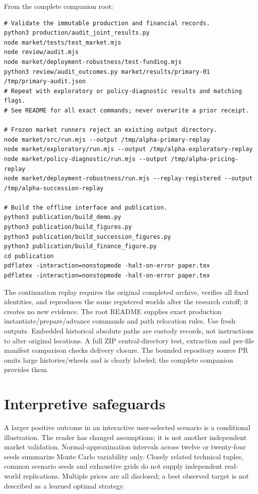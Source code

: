 \documentclass[11pt,a4paper]{article}
\begin{document}
From the complete companion root:
\begin{lstlisting}
# Validate the immutable production and financial records.
python3 production/audit_joint_results.py
node market/tests/test_market.mjs
node review/audit.mjs
node market/deployment-robustness/test-funding.mjs
python3 review/audit_outcomes.py market/results/primary-01 /tmp/primary-audit.json
# Repeat with exploratory or policy-diagnostic results and matching flags.
# See README for all exact commands; never overwrite a prior receipt.

# Frozen market runners reject an existing output directory.
node market/src/run.mjs --output /tmp/alpha-primary-replay
node market/exploratory/run.mjs --output /tmp/alpha-exploratory-replay
node market/policy-diagnostic/run.mjs --output /tmp/alpha-pricing-replay
node market/deployment-robustness/run.mjs --replay-registered --output /tmp/alpha-succession-replay

# Build the offline interface and publication.
python3 publication/build_demo.py
python3 publication/build_figures.py
python3 publication/build_succession_figures.py
python3 publication/build_finance_figure.py
cd publication
pdflatex -interaction=nonstopmode -halt-on-error paper.tex
pdflatex -interaction=nonstopmode -halt-on-error paper.tex
\end{lstlisting}
The continuation replay requires the original completed archive, verifies all fixed identities,
and reproduces the same registered worlds after the research cutoff; it creates no new evidence.
The root README supplies exact production instantiate/prepare/advance commands and path
relocation rules. Use fresh outputs. Embedded historical absolute paths are custody records,
not instructions to alter original locations. A full ZIP central-directory test, extraction
and per-file manifest comparison checks delivery closure. The bounded repository source PR
omits large histories/wheels and is clearly labeled; the complete companion provides them.

\section{Interpretive safeguards}
A larger positive outcome in an interactive user-selected scenario is a conditional illustration.
The reader has changed assumptions; it is not another independent market validation.
Normal-approximation intervals across twelve or twenty-four seeds summarize Monte Carlo
variability only. Closely related technical tuples, common scenario seeds and exhaustive grids
do not supply independent real-world replications. Multiple prices are all disclosed; a best
observed target is not described as a learned optimal strategy.
\end{document}
